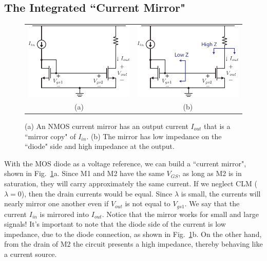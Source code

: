 \subsection{The Integrated ``Current Mirror"}
\begin{figure}[tb]
\centering
\begin{tabular}{cc}
\includegraphics[scale=1]{5mirror_105.pdf} &
\includegraphics[scale=1]{5bmirror_105.pdf}\\
(a) & (b)\\
\end{tabular}
\caption{(a) An NMOS current mirror has an output current $I_{out}$ that is a ``mirror copy" of $I_{in}$.  (b) The mirror has low impedance on the ``diode" side and high impedance at the output.} \label{fig:5mirror_105.pdf}
\end{figure}
With the MOS diode as a voltage reference, we can build a ``current mirror", shown in Fig.~\ref{fig:5mirror_105.pdf}a.  Since M1 and M2 have the same $V_{GS}$, as long as M2 is in saturation, they will carry approximately the same current.  If we neglect CLM ($\lambda = 0$), then the drain currents would be equal. Since $\lambda$ is small, the currents will nearly mirror one another even if $V_{out}$ is not equal to $V_{gs1}$. We say that the current $I_{in}$ is mirrored into $I_{out}$. Notice that the mirror works for small and large signals!
It's important to note that the diode side of the current is low impedance, due to the diode connection, as shown in Fig.~\ref{fig:5mirror_105.pdf}b.  On the other hand, from the drain of M2 the circuit presents a high impedance, thereby behaving like a current source.
